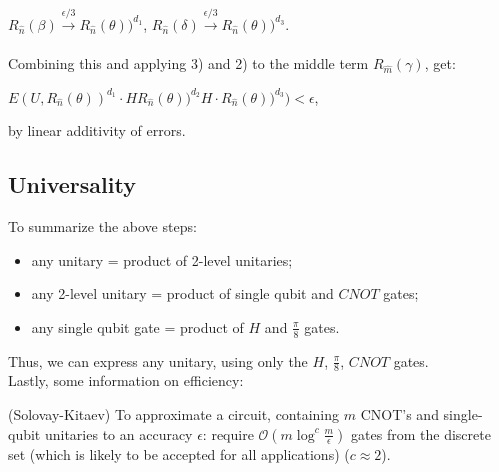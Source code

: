 $R_{\hat{n}}(\beta) \xrightarrow{\epsilon / 3} R_{\hat{n}}(\theta))^{d_1}$, $R_{\hat{n}}(\delta) \xrightarrow{\epsilon / 3} R_{\hat{n}}(\theta))^{d_3}$. \\ \\
Combining this and applying 3) and 2) to the middle term $R_{\hat{m}}(\gamma)$, get:
\begin{center}
    $E(U, R_{\hat{n}}(\theta))^{d_1} \cdot HR_{\hat{n}}(\theta))^{d_2} H \cdot R_{\hat{n}}(\theta))^{d_3}) < \epsilon$,
\end{center}
by linear additivity of errors. \\
\subsection{Universality}

To summarize the above steps: 
\begin{itemize}
    \item any unitary = product of 2-level unitaries;
    \item any 2-level unitary = product of single qubit and $CNOT$ gates;
    \item any single qubit gate = product of $H$ and $\frac{\pi}{8}$ gates.
\end{itemize}
Thus, we can express any unitary, using only the $H$, $\frac{\pi}{8}$, $CNOT$ gates. \\

Lastly, some information on efficiency:
\begin{theorem} (Solovay-Kitaev)
    To approximate a circuit, containing $m$ CNOT's and single-qubit unitaries to an accuracy $\epsilon$: require $\mathcal{O}(m \log ^c \frac{m}{\epsilon})$ gates from the discrete set (which is likely to be accepted for all applications) ($c \approx 2$).
\end{theorem}
